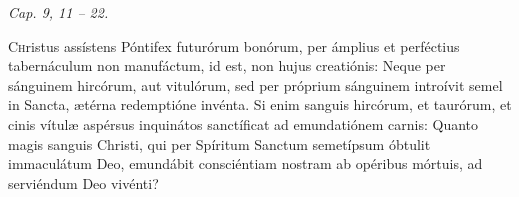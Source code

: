 
{\hfill \textit{Cap. 9, 11 – 22.}} 

\lettrine{C}{h}ristus assístens Póntifex futurórum bonórum, per ámplius et perfé\-ctius tabernáculum non manufá\-ctum, id est, non hujus creatiónis:
Neque per sánguinem hircórum, aut vitulórum, sed per próprium sánguinem introívit semel in San\-cta, ætérna redemptióne invénta.
Si enim sanguis hircórum, et taurórum, et cinis vítulæ aspérsus inquinátos sanctíficat ad emundatiónem carnis:
Quanto magis sanguis Christi, qui per Spíritum San\-ctum semetípsum óbtulit immaculátum Deo, emundábit consciéntiam nostram ab opéribus mórtuis, ad serviéndum Deo vivénti?